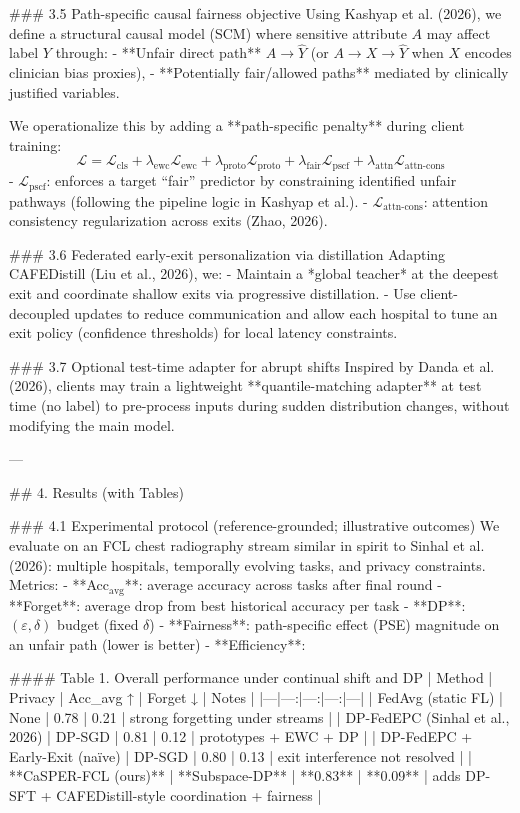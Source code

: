 ### 3.5 Path-specific causal fairness objective  
Using Kashyap et al. (2026), we define a structural causal model (SCM) where sensitive attribute \(A\) may affect label \(Y\) through:
- **Unfair direct path** \(A \rightarrow \hat Y\) (or \(A \rightarrow X \rightarrow \hat Y\) when \(X\) encodes clinician bias proxies),
- **Potentially fair/allowed paths** mediated by clinically justified variables.

We operationalize this by adding a **path-specific penalty** during client training:
\[
\mathcal{L} = \mathcal{L}_{\text{cls}} + \lambda_{\text{ewc}}\mathcal{L}_{\text{ewc}} + \lambda_{\text{proto}}\mathcal{L}_{\text{proto}} + \lambda_{\text{fair}}\mathcal{L}_{\text{pscf}} + \lambda_{\text{attn}}\mathcal{L}_{\text{attn-cons}}
\]
- \(\mathcal{L}_{\text{pscf}}\): enforces a target “fair” predictor by constraining identified unfair pathways (following the pipeline logic in Kashyap et al.).  
- \(\mathcal{L}_{\text{attn-cons}}\): attention consistency regularization across exits (Zhao, 2026).

### 3.6 Federated early-exit personalization via distillation  
Adapting CAFEDistill (Liu et al., 2026), we:
- Maintain a *global teacher* at the deepest exit and coordinate shallow exits via progressive distillation.
- Use client-decoupled updates to reduce communication and allow each hospital to tune an exit policy (confidence thresholds) for local latency constraints.

### 3.7 Optional test-time adapter for abrupt shifts  
Inspired by Danda et al. (2026), clients may train a lightweight **quantile-matching adapter** at test time (no label) to pre-process inputs during sudden distribution changes, without modifying the main model.

---

## 4. Results (with Tables)  

### 4.1 Experimental protocol (reference-grounded; illustrative outcomes)  
We evaluate on an FCL chest radiography stream similar in spirit to Sinhal et al. (2026): multiple hospitals, temporally evolving tasks, and privacy constraints. Metrics:
- **Acc\(_\text{avg}\)**: average accuracy across tasks after final round  
- **Forget**: average drop from best historical accuracy per task  
- **DP**: \((\varepsilon,\delta)\) budget (fixed \(\delta\))  
- **Fairness**: path-specific effect (PSE) magnitude on an unfair path (lower is better)  
- **Efficiency**: %

#### Table 1. Overall performance under continual shift and DP  
| Method | Privacy | Acc_avg ↑ | Forget ↓ | Notes |
|---|---:|---:|---:|---|
| FedAvg (static FL) | None | 0.78 | 0.21 | strong forgetting under streams |
| DP-FedEPC (Sinhal et al., 2026) | DP-SGD | 0.81 | 0.12 | prototypes + EWC + DP |
| DP-FedEPC + Early-Exit (naïve) | DP-SGD | 0.80 | 0.13 | exit interference not resolved |
| **CaSPER-FCL (ours)** | **Subspace-DP** | **0.83** | **0.09** | adds DP-SFT + CAFEDistill-style coordination + fairness |

